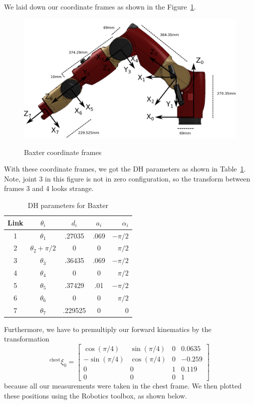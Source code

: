 \documentclass{../lab}
\begin{document}
\begin{task}

  We laid down our coordinate frames as shown in the Figure~\ref{Baxter Coordinate}.

  \begin{figure}[H]
    \centering
    \includegraphics[scale=.4]{baxter.png}
    \label{Baxter Coordinate}
    \caption{Baxter coordinate frames}
  \end{figure}

  With these coordinate frames, we got the DH parameters as shown in Table~\ref{DH}. Note, joint 3 in this figure is not in zero configuration, so the transform between frames 3 and 4 looks strange.

  \begin{table}[H]
    \centering
    \begin{tabular}{|c|c|c|c|r|}
     \hline
     Link & $\theta_i$ & $d_i$ & $a_i$ & $\alpha_i$ \\
     \hline
     1 & $\theta_1$ & .27035 & .069 & $-\pi/2$ \\
     2 & $\theta_2 + \pi/2$ & 0 & 0 & $\pi/2 $\\
     3 & $\theta_3$ & .36435 & .069 & $-\pi/2$ \\
     4 & $\theta_4$ & 0 & 0 & $\pi/2$ \\
     5 & $\theta_5$ & .37429 & .01 & $-\pi/2$ \\
     6 & $\theta_6$ & 0 & 0 & $\pi/2$ \\
     7 & $\theta_7$ & .229525 & 0 & 0 \\
     \hline
    \end{tabular}
  \caption{DH parameters for Baxter}
  \label{DH}
  \end{table}

  Furthermore, we have to premultiply our forward kinematics by the transformation
  \[
    ^{\text{chest}}\xi_0 =
    \begin{bmatrix}
      \cos(\pi/4) & \sin(\pi/4) & 0 & 0.0635 \\
      -\sin(\pi/4) & \cos(\pi/4) & 0 & -0.259 \\
      0 & 0 & 1 & 0.119 \\
      0 & 0 & 0 & 1
    \end{bmatrix}
  \]
  because all our measurements were taken in the chest frame. We then plotted these positions using the Robotics toolbox, as shown below.


\end{task}
\end{document}
